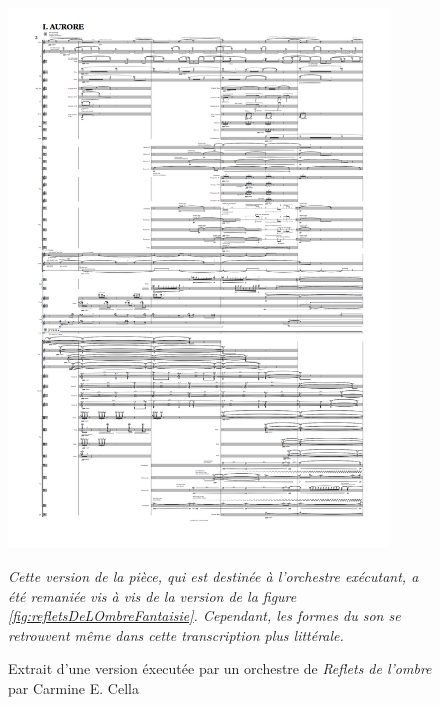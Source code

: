 \begin{figure}[H]
	\centering
	\includegraphics[keepaspectratio=true, width=0.9\textwidth]{Annexes/i/refletsDeLOmbreReel.png}
	\caption{Extrait d'une version éxecutée par un orchestre de \textit{Reflets de l'ombre} par Carmine E. Cella}
	\label{fig:refletsDeLOmbreReel}
	\medskip
	\small
	\it
	Cette version de la pièce, qui est destinée à l'orchestre exécutant, a été remaniée vis à vis de la version de la figure \ref{fig:refletsDeLOmbreFantaisie}. Cependant, les formes du son se retrouvent même dans cette transcription plus littérale.
\end{figure}
\clearpage

